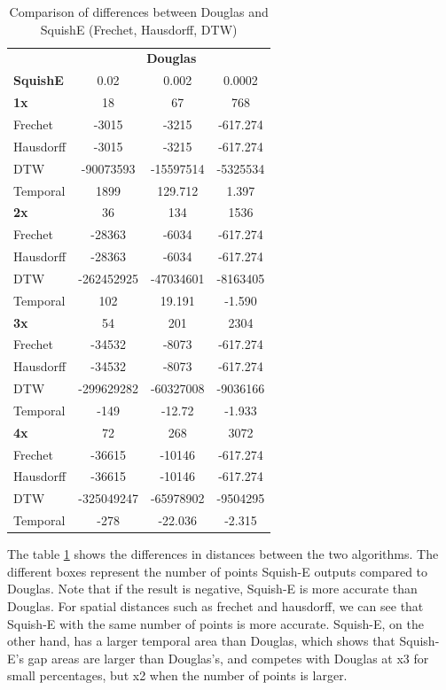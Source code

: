 \begin{table}[htbp]
	\centering
	\label{tab:douglas_vs_squish_comparison}
	\begin{tabular}{@{}lccc@{}}
		\toprule
		& \multicolumn{3}{c}{\textbf{Douglas}} \\
		\cmidrule(l){2-4}
		\textbf{SquishE} & 0.02 & 0.002 & 0.0002 \\
		\midrule
		\textbf{1x} 	& 18 	& 67 & 768 \\
		Frechet 		& -3015 & -3215 & -617.274 \\
		Hausdorff 		& -3015 	& -3215 & -617.274 \\
		DTW 			& -90073593 	& -15597514 & -5325534 \\
		Temporal 		& 1899 	& 129.712 & 1.397 \\ \midrule
		\textbf{2x} 	& 36 & 134 & 1536 \\
		Frechet 		& -28363 & -6034 & -617.274 \\
		Hausdorff 		& -28363 & -6034 & -617.274 \\
		DTW  		& -262452925 & -47034601 & -8163405 \\
		Temporal 	& 102 & 19.191 & -1.590 \\ \midrule
		\textbf{3x} 	& 54 & 201 & 2304 \\
		Frechet 		& -34532 & -8073 & -617.274 \\
		Hausdorff 		& -34532 & -8073 & -617.274 \\
		DTW 		& -299629282 & -60327008 & -9036166 \\
		Temporal 			& -149 & -12.72 & -1.933 \\ \midrule
		\textbf{4x} 	& 72 & 268 & 3072 \\
		Frechet 		& -36615 & -10146 & -617.274 \\
		Hausdorff 		& -36615 & -10146 & -617.274 \\
		DTW 		& -325049247 & -65978902 & -9504295 \\
		Temporal 			& -278 & -22.036 & -2.315 \\
		\bottomrule
	\end{tabular}
	\caption{Comparison of differences between Douglas and SquishE (Frechet, Hausdorff, DTW)}
\end{table}

The table \ref{tab:douglas_vs_squish_comparison} shows the differences in distances between the two algorithms. The different boxes represent the number of points Squish-E outputs compared to Douglas. 
Note that if the result is negative, Squish-E is more accurate than Douglas. For spatial distances such as frechet and hausdorff, we can see that Squish-E with the same number of points is more accurate. Squish-E, on the other hand, has a larger temporal area than Douglas, which shows that Squish-E's gap areas are larger than Douglas's, and competes with Douglas at x3 for small percentages, but x2 when the number of points is larger. 



